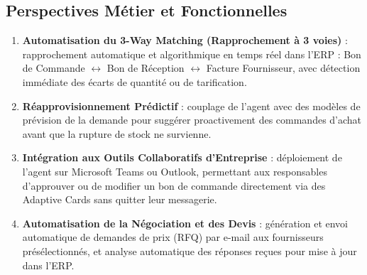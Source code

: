 \subsection{Perspectives Métier et Fonctionnelles}
 
\begin{enumerate}
    \item \textbf{Automatisation du 3-Way Matching (Rapprochement à 3 voies)} : rapprochement automatique et algorithmique en temps réel dans l'ERP : Bon de Commande $\leftrightarrow$ Bon de Réception $\leftrightarrow$ Facture Fournisseur, avec détection immédiate des écarts de quantité ou de tarification.
    \item \textbf{Réapprovisionnement Prédictif} : couplage de l'agent avec des modèles de prévision de la demande pour suggérer proactivement des commandes d'achat avant que la rupture de stock ne survienne.
    \item \textbf{Intégration aux Outils Collaboratifs d'Entreprise} : déploiement de l'agent sur Microsoft Teams ou Outlook, permettant aux responsables d'approuver ou de modifier un bon de commande directement via des Adaptive Cards sans quitter leur messagerie.
    \item \textbf{Automatisation de la Négociation et des Devis} : génération et envoi automatique de demandes de prix (RFQ) par e-mail aux fournisseurs présélectionnés, et analyse automatique des réponses reçues pour mise à jour dans l'ERP.
\end{enumerate}
 